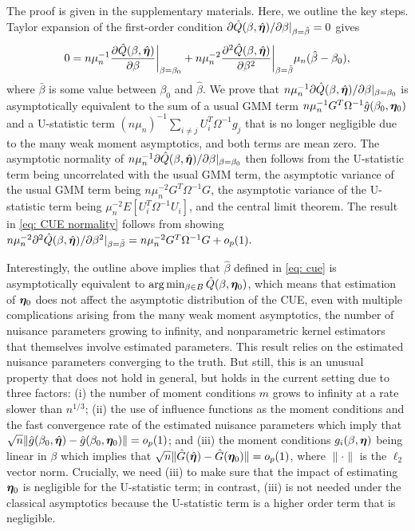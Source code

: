 \documentclass[12pt]{article}
\begin{document}
The proof is given in the supplementary materials. Here, we outline the key steps. Taylor expansion of the first-order condition $ \partial  \hat{Q}({ \beta}, \hat {\bm \eta}) /\partial \beta |_{\beta= \hat  \beta} = 0$ gives 
\[
0=n \mu_n^{-1} \frac{\partial \hat Q(\beta, \hat{\bm \eta})}{\partial \beta}\bigg|_{\beta=\beta_0} + n \mu_n^{-2}  \frac{\partial^2 \hat Q (\beta, \hat{\bm \eta})}{\partial \beta^2} \bigg|_{\beta=\bar\beta} \mu_n (\hat\beta- \beta_0),
\]  
where $\bar\beta$ is some value between $\beta_0$ and $\hat\beta$. We  prove that  $n\mu_n^{-1} \partial  \hat{Q}({ \beta}, \hat {\bm \eta}) /\partial \beta |_{\beta= \beta_0}$ is asymptotically equivalent to the sum of  a usual GMM term $ n\mu_n^{-1} G^T \Omega^{-1} \hat{g} (\beta_0, \bm \eta_0) $ and a U-statistic term $ (n\mu_n)^{-1} \sum_{i\neq j} {U}_i^T \Omega^{-1} g_j $ that is no longer negligible due to the many weak moment asymptotics, and both terms are mean zero. The asymptotic normality of  $n\mu_n^{-1} \partial  \hat{Q}({ \beta}, \hat {\bm \eta}) /\partial \beta |_{\beta= \beta_0}$ then follows from 
 the U-statistic term being uncorrelated with the usual GMM term, the asymptotic variance of the usual GMM term being $ n \mu_n^{-2} G^T \Omega^{-1} G $, the asymptotic variance of the U-statistic term being $ \mu_n^{-2}  E[  U_i^T \Omega^{-1} U_i] $, and the central limit theorem. The result in \eqref{eq: CUE normality} follows from  showing
$ n \mu_n^{-2}   \partial^2 \hat Q (\beta, \hat{\bm \eta})/ \partial \beta^2 |_{\beta=\bar\beta}   =  n \mu_n^{-2}  G^T \Omega^{-1} G  + o_p(1) . $
 
Interestingly, the  outline above implies that $ \hat\beta $ defined in \eqref{eq: cue} is asymptotically equivalent to $ \arg\min_{\beta\in B} \hat{Q}({ \beta}, \bm \eta_0) $, which means that estimation of $ \bm \eta_0 $ does not affect the asymptotic distribution of the CUE, even with multiple complications arising from the many weak moment asymptotics, the number of nuisance parameters growing to infinity, and nonparametric kernel estimators that themselves involve estimated parameters. {This result relies on the estimated nuisance parameters converging to the truth.} But still, this is an unusual property that does not hold in general, but holds in the current setting  due to three factors: (i) the number of moment conditions $ m $ grows to infinity at a rate slower than $ n^{1/3} $; (ii) the use of influence functions as the moment conditions and the fast convergence rate of the estimated nuisance parameters which imply  that $ \sqrt{n} \|\hat g (\beta_0, \hat{\bm \eta}) - \hat g (\beta_0, \bm \eta_0)  \| = o_p(1)$; and (iii) the moment conditions $ g_i(\beta, \bm \eta) $ being linear in $ \beta $ which implies that  $ \sqrt{n} \|\hat G ( \hat{\bm \eta}) - \hat G ( \bm \eta_0)  \| = o_p(1)$, where $ \| \cdot\| $ is the $ \ell_2 $ vector norm. Crucially, we need (iii) to make sure that the impact of estimating $ \bm \eta_0 $ is negligible for the U-statistic term; in contrast, (iii) is not needed under the classical asymptotics because the U-statistic term is a higher order term that is negligible. 
\end{document}
